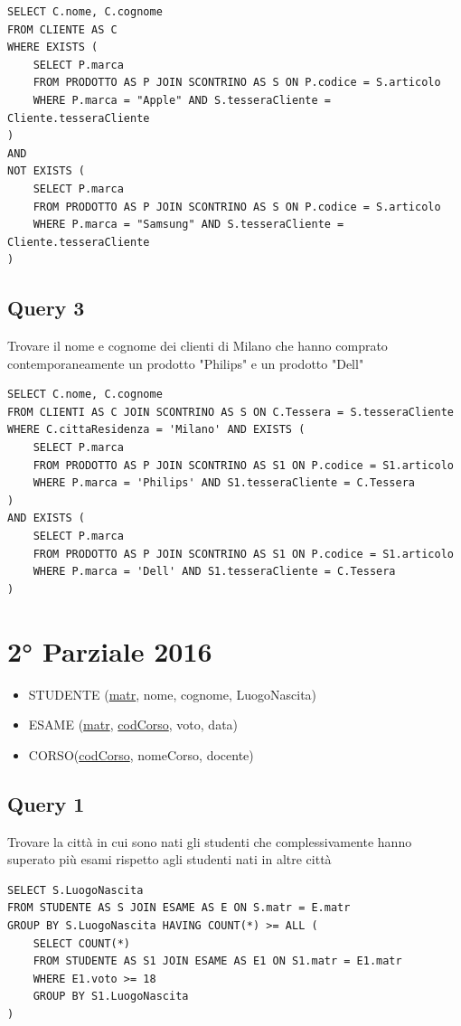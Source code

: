 \begin{lstlisting}
SELECT C.nome, C.cognome
FROM CLIENTE AS C
WHERE EXISTS (
    SELECT P.marca
    FROM PRODOTTO AS P JOIN SCONTRINO AS S ON P.codice = S.articolo
    WHERE P.marca = "Apple" AND S.tesseraCliente = Cliente.tesseraCliente
)
AND
NOT EXISTS (
    SELECT P.marca
    FROM PRODOTTO AS P JOIN SCONTRINO AS S ON P.codice = S.articolo
    WHERE P.marca = "Samsung" AND S.tesseraCliente = Cliente.tesseraCliente
)
\end{lstlisting}

\newpage
\subsection{Query 3}
Trovare il nome e cognome dei clienti di Milano che hanno comprato contemporaneamente un prodotto "Philips" e un prodotto "Dell"

\begin{lstlisting}
SELECT C.nome, C.cognome
FROM CLIENTI AS C JOIN SCONTRINO AS S ON C.Tessera = S.tesseraCliente
WHERE C.cittaResidenza = 'Milano' AND EXISTS (
    SELECT P.marca
    FROM PRODOTTO AS P JOIN SCONTRINO AS S1 ON P.codice = S1.articolo
    WHERE P.marca = 'Philips' AND S1.tesseraCliente = C.Tessera
)
AND EXISTS (
    SELECT P.marca
    FROM PRODOTTO AS P JOIN SCONTRINO AS S1 ON P.codice = S1.articolo
    WHERE P.marca = 'Dell' AND S1.tesseraCliente = C.Tessera
)
\end{lstlisting}

\newpage
\section{2° Parziale 2016}
\begin{itemize}
    \item STUDENTE (\underline{matr}, nome, cognome, LuogoNascita) 
    \item ESAME (\underline{matr}, \underline{codCorso}, voto, data) 
    \item CORSO(\underline{codCorso}, nomeCorso, docente)
\end{itemize}

\subsection{Query 1}
Trovare la città in cui sono nati gli studenti che complessivamente hanno superato più esami rispetto agli studenti nati in altre città

\begin{lstlisting}
SELECT S.LuogoNascita
FROM STUDENTE AS S JOIN ESAME AS E ON S.matr = E.matr
GROUP BY S.LuogoNascita HAVING COUNT(*) >= ALL (
    SELECT COUNT(*)
    FROM STUDENTE AS S1 JOIN ESAME AS E1 ON S1.matr = E1.matr
    WHERE E1.voto >= 18
    GROUP BY S1.LuogoNascita
)
\end{lstlisting}

